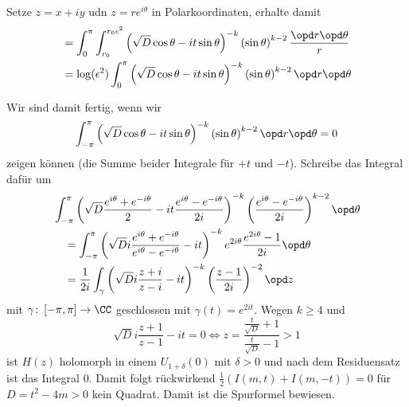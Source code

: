 Setze $z = x + iy$ udn $z = r e^{i \theta}$ in Polarkoordinaten, erhalte damit
\begin{align*}
	&= \int_0^{\pi} \int_{r_0}^{r_0 \epsilon^2} \left( \sqrt{D} \cos \theta - it \sin \theta \right)^{-k} \left( \sin \theta \right)^{k-2} \frac {\opd r \opd \theta}r \\
	&= \log (\epsilon^2) \int_0^\pi \left( \sqrt{D} \cos \theta - it \sin \theta \right)^{-k} \left( \sin \theta \right)^{k-2} \opd r \opd \theta
\end{align*}

Wir sind damit fertig, wenn wir
\[
	\int_{-\pi}^\pi \left( \sqrt{D} \cos \theta - it \sin \theta \right)^{-k} \left( \sin \theta \right)^{k-2} \opd r \opd \theta = 0
\]
zeigen können (die Summe beider Integrale für $+t$ und $-t$). Schreibe das Integral dafür um
\begin{align*}
	& \int_{-\pi}^{\pi} \left( \sqrt D \frac {e^{i\theta} + e^{-i\theta}}2 - it \frac {e^{i\theta} - e^{-i\theta}}{2i} \right)^{-k} \left( \frac {e^{i\theta} - e^{-i\theta}}{2i} \right)^{k-2} \opd \theta \\
	&\quad = \int_{-\pi}^{\pi} \left( \sqrt D i \frac {e^{i\theta} + e^{-i\theta}}{e^{i\theta} - e^{-i\theta}} - it \right)^{-k} e^{2i\theta} \frac{e^{2i\theta} - 1}{2i} \opd \theta \\
	&\quad = \frac 1{2i} \int_\gamma \left( \sqrt D i \frac {z+i}{z-i} - it \right)^{-k} \left( \frac{z-1}{2i} \right)^{-2} \opd z
\end{align*}
mit $\gamma \colon \left[ -\pi, \pi \right] \to \CC$ geschlossen mit $\gamma(t) = e^{2it}$. Wegen $k \geq 4$ und 
\[
	\sqrt D i \frac{z+1}{z-1} - it = 0 \Leftrightarrow z = \frac {\frac t{\sqrt{D}} + 1}{\frac t{\sqrt{D}} - 1} > 1
\]
ist $H(z)$ holomorph in einem $U_{1 + \delta}(0)$ mit $\delta > 0$ und nach dem Residuensatz ist das Integral $0$. Damit folgt rückwirkend $\frac 12 \left( I(m,t) + I(m,-t) \right) = 0$ für $D = t^2 - 4m > 0$ kein Quadrat. Damit ist die Spurformel bewiesen.